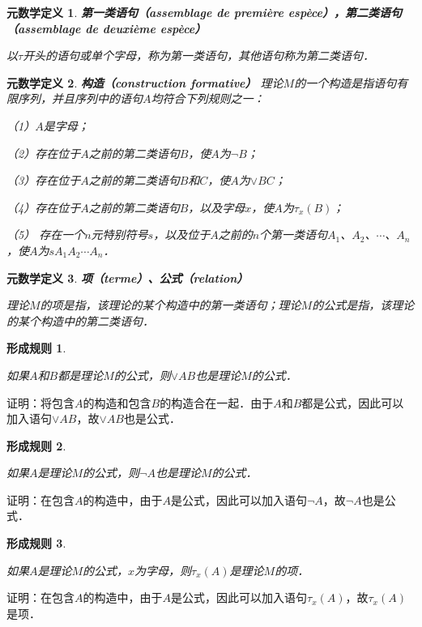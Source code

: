 \documentclass[12pt, a4paper, oneside]{book}
\newtheorem{metadef}{元数学定义}
\newtheorem{CF}{形成规则}
\begin{document}
			\begin{metadef}
				\textbf{第一类语句（assemblage de première espèce），第二类语句\\（assemblage de deuxième espèce）}
				\par
				以$\tau$开头的语句或单个字母，称为第一类语句，其他语句称为第二类语句．
			\end{metadef}

			\begin{metadef}
				\textbf{构造（construction formative）}
				理论$M$的一个构造是指语句有限序列，并且序列中的语句$A$均符合下列规则之一：
				\par
				（1）$A$是字母；
				\par
				（2）存在位于$A$之前的第二类语句$B$，使$A$为$\neg B$；
				\par
				（3）存在位于$A$之前的第二类语句$B$和$C$，使$A$为$\lor BC$；
				\par
				（4）存在位于$A$之前的第二类语句$B$，以及字母$x$，使$A$为$\tau_x(B)$；
				\par
				（5）	存在一个$n$元特别符号$s$，以及位于$A$之前的$n$个第一类语句$A_1$、$A_2$、$\cdots$、$A_n$，使$A$为$sA_1A_2\cdots A_n$．
			\end{metadef}
			
			\begin{metadef}
				\textbf{项（terme）、公式（relation）}
				\par
				理论$M$的项是指，该理论的某个构造中的第一类语句；理论$M$的公式是指，该理论的某个构造中的第二类语句．
			\end{metadef}

			\begin{CF}\label{CF1}
				\hfill\par
				如果$A$和$B$都是理论$M$的公式，则$\lor AB$也是理论$M$的公式．
			\end{CF}
			证明：将包含$A$的构造和包含$B$的构造合在一起．由于$A$和$B$都是公式，因此可以加入语句$\lor AB$，故$\lor AB$也是公式．

			\begin{CF}\label{CF2}
				\hfill\par
				如果$A$是理论$M$的公式，则$\neg A$也是理论$M$的公式．
			\end{CF}
			证明：在包含$A$的构造中，由于$A$是公式，因此可以加入语句$\neg A$，故$\neg A$也是公式．

			\begin{CF}\label{CF3}
				\hfill\par
				如果$A$是理论$M$的公式，$x$为字母，则$\tau_x(A)$是理论$M$的项．
			\end{CF}
			证明：在包含$A$的构造中，由于$A$是公式，因此可以加入语句$\tau_x(A)$，故$\tau_x(A)$是项．
\end{document}
